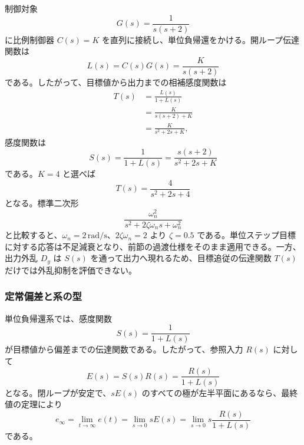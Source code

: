 \begin{example}[比例制御による二次閉ループ]
制御対象
\begin{equation}
  G(s)=\frac{1}{s(s+2)}
\end{equation}
に比例制御器 $C(s)=K$ を直列に接続し、単位負帰還をかける。開ループ伝達関数は
\begin{equation}
  L(s)=C(s)G(s)=\frac{K}{s(s+2)}
\end{equation}
である。したがって、目標値から出力までの相補感度関数は
\begin{align}
  T(s)
  &=\frac{L(s)}{1+L(s)}\\
  &=
  \frac{K}{s(s+2)+K}\\
  &=
  \frac{K}{s^2+2s+K},
  \label{eq:proportional-loop-example}
\end{align}
感度関数は
\begin{equation}
  S(s)=\frac{1}{1+L(s)}
  =
  \frac{s(s+2)}{s^2+2s+K}
\end{equation}
である。$K=4$ と選べば
\begin{equation}
  T(s)=\frac{4}{s^2+2s+4}
\end{equation}
となる。標準二次形
\begin{equation}
  \frac{\omega_n^2}{s^2+2\zeta\omega_n s+\omega_n^2}
\end{equation}
と比較すると、$\omega_n=2\,\mathrm{rad/s}$、$2\zeta\omega_n=2$ より $\zeta=0.5$ である。単位ステップ目標に対する応答は不足減衰となり、前節の過渡仕様をそのまま適用できる。一方、出力外乱 $D_y$ は $S(s)$ を通って出力へ現れるため、目標追従の伝達関数 $T(s)$ だけでは外乱抑制を評価できない。
\end{example}

\subsubsection{定常偏差と系の型}

単位負帰還系では、感度関数
\begin{equation}
  S(s)=\frac{1}{1+L(s)}
\end{equation}
が目標値から偏差までの伝達関数である。したがって、参照入力 $R(s)$ に対して
\begin{equation}
  E(s)=S(s)R(s)=\frac{R(s)}{1+L(s)}
  \label{eq:steady-error-transfer}
\end{equation}
となる。閉ループが安定で、$sE(s)$ のすべての極が左半平面にあるなら、最終値の定理により
\begin{equation}
  e_\infty=\lim_{t\to\infty}e(t)
  =
  \lim_{s\to0}sE(s)
  =
  \lim_{s\to0}s\frac{R(s)}{1+L(s)}
  \label{eq:steady-error-final-value}
\end{equation}
である。

